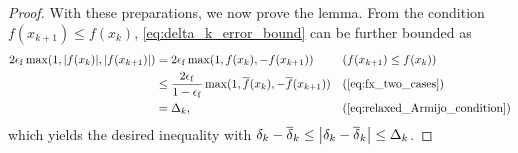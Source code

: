 \documentclass[journal_revised_MPC]{subfiles}
\begin{document}
\begin{proof}
    With these preparations, we now prove the lemma.
    From the condition $f(x_{k+1}) \le f(x_k)$, \cref{eq:delta_k_error_bound} can be further bounded as
    \begin{align*}
        2 \feps \max(1,\abs{f(x_k)},\abs{f(x_{k+1})})
         & = 2 \feps \max(1,f(x_k),-f(x_{k+1}))                                        &  & (\text{$f(x_{k+1}) \le f(x_k)$}) \\
         & \le \frac{2 \feps}{1-\feps}\max(1,\overline{f}(x_k),-\overline{f}(x_{k+1})) &  & (\text{\cref{eq:fx_two_cases}})  \\
         & = \Delta_k,                                                                 &  &
        (\text{\cref{eq:relaxed_Armijo_condition}})
    \end{align*}
    which yields the desired inequality with $\delta_k - \overline{\delta}_k \leq \abs{\delta_k - \overline{\delta}_k} \leq \Delta_k$.
    \myQED
\end{proof}
\end{document}
